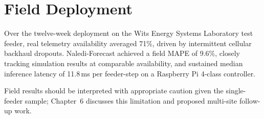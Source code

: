 \section{Field Deployment}
Over the twelve-week deployment on the Wits Energy Systems Laboratory test feeder, real
telemetry availability averaged 71\%, driven by intermittent cellular backhaul dropouts.
Naledi-Forecast achieved a field MAPE of 9.6\%, closely tracking simulation results at
comparable availability, and sustained median inference latency of 11.8\,ms per feeder-step
on a Raspberry Pi 4-class controller.

\begin{notebox}
Field results should be interpreted with appropriate caution given the single-feeder sample;
Chapter~6 discusses this limitation and proposed multi-site follow-up work.
\end{notebox}

